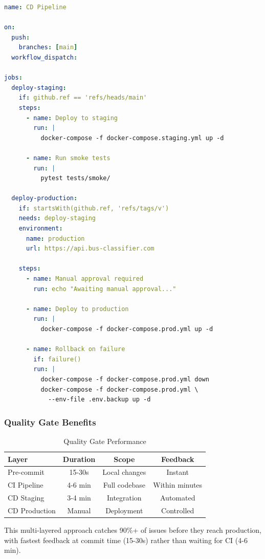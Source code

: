 \begin{lstlisting}[language=yaml, caption=.github/workflows/cd.yml (excerpt)]
name: CD Pipeline

on:
  push:
    branches: [main]
  workflow_dispatch:

jobs:
  deploy-staging:
    if: github.ref == 'refs/heads/main'
    steps:
      - name: Deploy to staging
        run: |
          docker-compose -f docker-compose.staging.yml up -d
      
      - name: Run smoke tests
        run: |
          pytest tests/smoke/
  
  deploy-production:
    if: startsWith(github.ref, 'refs/tags/v')
    needs: deploy-staging
    environment:
      name: production
      url: https://api.bus-classifier.com
    
    steps:
      - name: Manual approval required
        run: echo "Awaiting manual approval..."
      
      - name: Deploy to production
        run: |
          docker-compose -f docker-compose.prod.yml up -d
      
      - name: Rollback on failure
        if: failure()
        run: |
          docker-compose -f docker-compose.prod.yml down
          docker-compose -f docker-compose.prod.yml \
            --env-file .env.backup up -d
\end{lstlisting}

\subsubsection{Quality Gate Benefits}

\begin{table}[h]
\centering
\caption{Quality Gate Performance}
\begin{tabular}{lccc}
\toprule
\textbf{Layer} & \textbf{Duration} & \textbf{Scope} & \textbf{Feedback} \\
\midrule
Pre-commit & 15-30s & Local changes & Instant \\
CI Pipeline & 4-6 min & Full codebase & Within minutes \\
CD Staging & 3-4 min & Integration & Automated \\
CD Production & Manual & Deployment & Controlled \\
\bottomrule
\end{tabular}
\end{table}

This multi-layered approach catches 90\%+ of issues before they reach production, with fastest feedback at commit time (15-30s) rather than waiting for CI (4-6 min).

